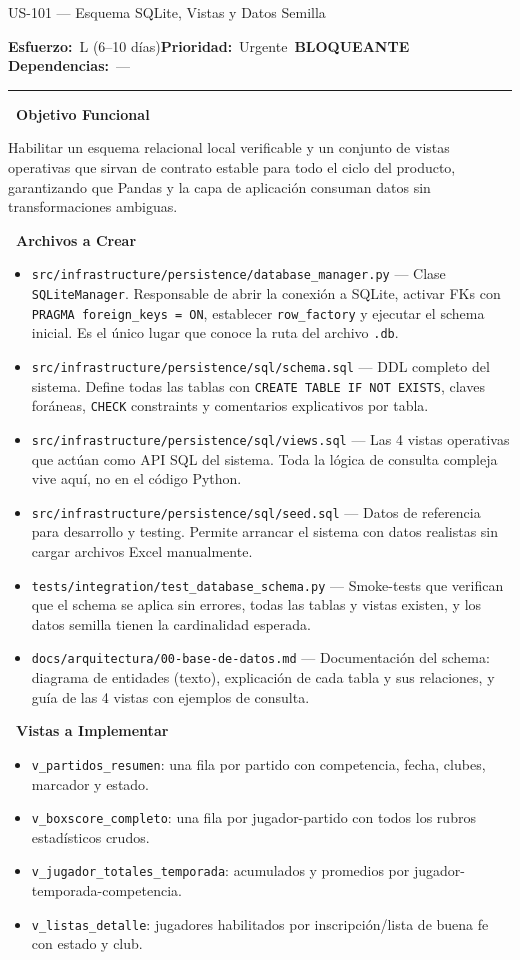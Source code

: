 \documentclass[11pt,a4paper]{article}
\newcommand{\fpath}[1]{\texttt{\small #1}}
\newcommand{\usfield}[2][\;]{%
  \par\vspace{5pt}%
  {\small\textbf{\textcolor{primary}{#2}}}\par\vspace{2pt}%
}
\newcommand{\usmeta}[3]{%
  \vspace{2pt}%
  {\small\textcolor{secondary}{%
    \textbf{Esfuerzo:}~#1\quad\textbf{Prioridad:}~#2\quad\textbf{Dependencias:}~#3%
  }}%
  \par\vspace{4pt}%
  \textcolor{bordergray}{\rule{\linewidth}{0.4pt}}\par\vspace{4pt}%
}
\newcommand{\tagblocking}{\,\colorbox{tagblue}{\tiny\bfseries BLOQUEANTE}\,}
\begin{document}
\begin{uscard}{US-101 — Esquema SQLite, Vistas y Datos Semilla}

\usmeta{L (6–10 días)}{Urgente \tagblocking}{—}

\usfield{\faAlignLeft\ Objetivo Funcional}
Habilitar un esquema relacional local verificable y un conjunto de vistas operativas que sirvan de contrato estable para todo el ciclo del producto, garantizando que Pandas y la capa de aplicación consuman datos sin transformaciones ambiguas.

\usfield{\faFolderOpen\ Archivos a Crear}
\begin{itemize}[nosep, leftmargin=1.6em]
  \item \fpath{src/infrastructure/persistence/database\_manager.py} — Clase \fpath{SQLiteManager}. Responsable de abrir la conexión a SQLite, activar FKs con \fpath{PRAGMA foreign\_keys = ON}, establecer \fpath{row\_factory} y ejecutar el schema inicial. Es el único lugar que conoce la ruta del archivo \fpath{.db}.
  \item \fpath{src/infrastructure/persistence/sql/schema.sql} — DDL completo del sistema. Define todas las tablas con \fpath{CREATE TABLE IF NOT EXISTS}, claves foráneas, \fpath{CHECK} constraints y comentarios explicativos por tabla.
  \item \fpath{src/infrastructure/persistence/sql/views.sql} — Las 4 vistas operativas que actúan como API SQL del sistema. Toda la lógica de consulta compleja vive aquí, no en el código Python.
  \item \fpath{src/infrastructure/persistence/sql/seed.sql} — Datos de referencia para desarrollo y testing. Permite arrancar el sistema con datos realistas sin cargar archivos Excel manualmente.
  \item \fpath{tests/integration/test\_database\_schema.py} — Smoke-tests que verifican que el schema se aplica sin errores, todas las tablas y vistas existen, y los datos semilla tienen la cardinalidad esperada.
  \item \fpath{docs/arquitectura/00-base-de-datos.md} — Documentación del schema: diagrama de entidades (texto), explicación de cada tabla y sus relaciones, y guía de las 4 vistas con ejemplos de consulta.
\end{itemize}

\usfield{\faTable\ Vistas a Implementar}
\begin{itemize}[nosep, leftmargin=1.6em]
  \item \fpath{v\_partidos\_resumen}: una fila por partido con competencia, fecha, clubes, marcador y estado.
  \item \fpath{v\_boxscore\_completo}: una fila por jugador-partido con todos los rubros estadísticos crudos.
  \item \fpath{v\_jugador\_totales\_temporada}: acumulados y promedios por jugador-temporada-competencia.
  \item \fpath{v\_listas\_detalle}: jugadores habilitados por inscripción/lista de buena fe con estado y club.
\end{itemize}


\end{uscard}
\end{document}
